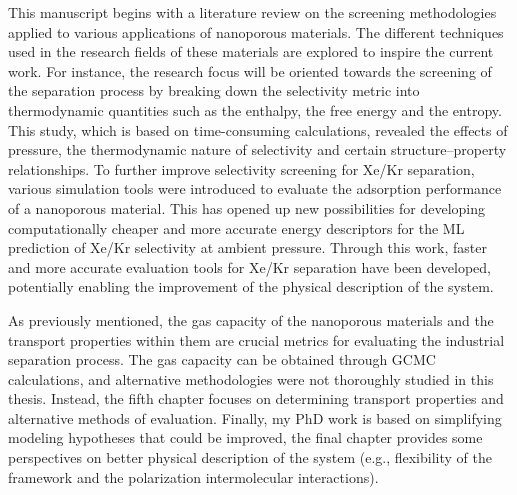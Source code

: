 \vspace{1cm}
\begin{center}
\end{center}
\clearpage

This manuscript begins with a literature review on the screening methodologies applied to various applications of nanoporous materials. The different techniques used in the research fields of these materials are explored to inspire the current work.\autocite{Ren_2022} For instance, the research focus will be oriented towards the screening of the separation process by breaking down the selectivity metric into thermodynamic quantities such as the enthalpy, the free energy and the entropy. This study, which is based on time-consuming calculations, revealed the effects of pressure, the thermodynamic nature of selectivity and certain structure--property relationships.\autocite{Ren_2021} To further improve selectivity screening for Xe/Kr separation, various simulation tools were introduced to evaluate the adsorption performance of a nanoporous material.\autocite{Ren_2023} This has opened up new possibilities for developing computationally cheaper and more accurate energy descriptors for the ML prediction of Xe/Kr selectivity at ambient pressure.\autocite{Ren_2023_ml} Through this work, faster and more accurate evaluation tools for Xe/Kr separation have been developed, potentially enabling the improvement of the physical description of the system. 

As previously mentioned, the gas capacity of the nanoporous materials and the transport properties within them are crucial metrics for evaluating the industrial separation process. The gas capacity can be obtained through GCMC calculations, and alternative methodologies were not thoroughly studied in this thesis. Instead, the fifth chapter focuses on determining transport properties and alternative methods of evaluation. Finally, my PhD work is based on simplifying modeling hypotheses that could be improved, the final chapter provides some perspectives on better physical description of the system (e.g., flexibility of the framework and the polarization intermolecular interactions).


\vfill
\begin{center}
\end{center}
\vfill\vfill